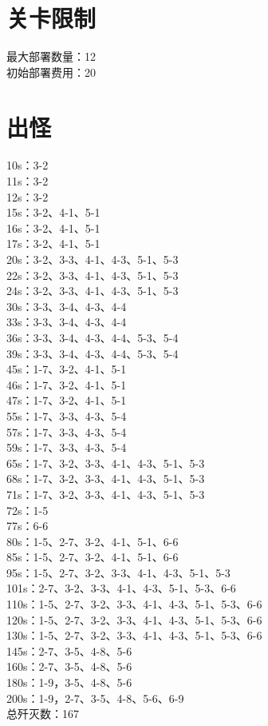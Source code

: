 \documentclass[a4paper,12pt]{article}
\begin{document}
	\section{关卡限制}
		最大部署数量：12\\
		\indent 初始部署费用：20
	\section{出怪}
		10s：3-2\\
		\indent 11s：3-2\\
		\indent 12s：3-2\\
		\indent 15s：3-2、4-1、5-1\\
		\indent 16s：3-2、4-1、5-1\\
		\indent 17s：3-2、4-1、5-1\\
		\indent 20s：3-2、3-3、4-1、4-3、5-1、5-3\\
		\indent 22s：3-2、3-3、4-1、4-3、5-1、5-3\\
		\indent 24s：3-2、3-3、4-1、4-3、5-1、5-3\\
		\indent 30s：3-3、3-4、4-3、4-4\\
		\indent 33s：3-3、3-4、4-3、4-4\\
		\indent 36s：3-3、3-4、4-3、4-4、5-3、5-4\\
		\indent 39s：3-3、3-4、4-3、4-4、5-3、5-4\\
		\indent 45s：1-7、3-2、4-1、5-1\\
		\indent 46s：1-7、3-2、4-1、5-1\\
		\indent 47s：1-7、3-2、4-1、5-1\\
		\indent 55s：1-7、3-3、4-3、5-4\\
		\indent 57s：1-7、3-3、4-3、5-4\\
		\indent 59s：1-7、3-3、4-3、5-4\\
		\indent 65s：1-7、3-2、3-3、4-1、4-3、5-1、5-3\\
		\indent 68s：1-7、3-2、3-3、4-1、4-3、5-1、5-3\\
		\indent 71s：1-7、3-2、3-3、4-1、4-3、5-1、5-3\\
		\indent 72s：1-5\\
		\indent 77s：6-6\\
		\indent 80s：1-5、2-7、3-2、4-1、5-1、6-6\\
		\indent 85s：1-5、2-7、3-2、4-1、5-1、6-6\\
		\indent 95s：1-5、2-7、3-2、3-3、4-1、4-3、5-1、5-3\\
		\indent 101s：2-7、3-2、3-3、4-1、4-3、5-1、5-3、6-6\\
		\indent 110s：1-5、2-7、3-2、3-3、4-1、4-3、5-1、5-3、6-6\\
		\indent 120s：1-5、2-7、3-2、3-3、4-1、4-3、5-1、5-3、6-6\\
		\indent 130s：1-5、2-7、3-2、3-3、4-1、4-3、5-1、5-3、6-6\\
		\indent 145s：2-7、3-5、4-8、5-6\\
		\indent 160s：2-7、3-5、4-8、5-6\\
		\indent 180s：1-9，3-5、4-8、5-6\\
		\indent 200s：1-9，2-7、3-5、4-8、5-6、6-9\\
		\indent 总歼灭数：167
\end{document}
